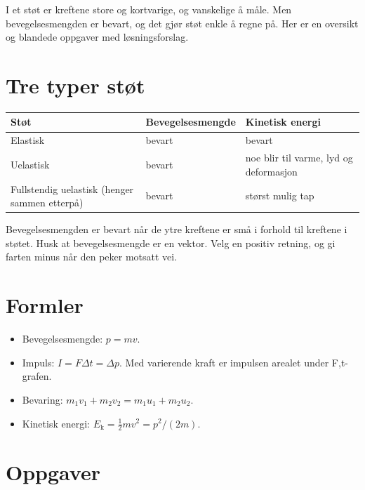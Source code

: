\documentclass[11pt]{article}
\begin{document}

I et støt er kreftene store og kortvarige, og vanskelige å måle. Men bevegelsesmengden er bevart, og det gjør støt enkle å regne på. Her er en oversikt og blandede oppgaver med løsningsforslag.

\section*{Tre typer støt}

\begin{center}\small
\begin{tabularx}{\linewidth}{YYY}
\toprule
\textbf{Støt} & \textbf{Bevegelsesmengde} & \textbf{Kinetisk energi} \\
\midrule
Elastisk & bevart & bevart \\
Uelastisk & bevart & noe blir til varme, lyd og deformasjon \\
Fullstendig uelastisk (henger sammen etterpå) & bevart & størst mulig tap \\
\bottomrule
\end{tabularx}
\end{center}

Bevegelsesmengden er bevart når de ytre kreftene er små i forhold til kreftene i støtet. Husk at bevegelsesmengde er en vektor. Velg en positiv retning, og gi farten minus når den peker motsatt vei.

\section*{Formler}

\begin{itemize}
\item Bevegelsesmengde: $p = mv$.
\item Impuls: $I = FΔt = Δp$. Med varierende kraft er impulsen arealet under F,t-grafen.
\item Bevaring: $m_{1}v_{1} + m_{2}v_{2} = m_{1}u_{1} + m_{2}u_{2}$.
\item Kinetisk energi: $E_{\mathrm{k}} = \tfrac{1}{2}mv^{2} = p^{2}/(2m)$.
\end{itemize}

\section*{Oppgaver}
\end{document}

